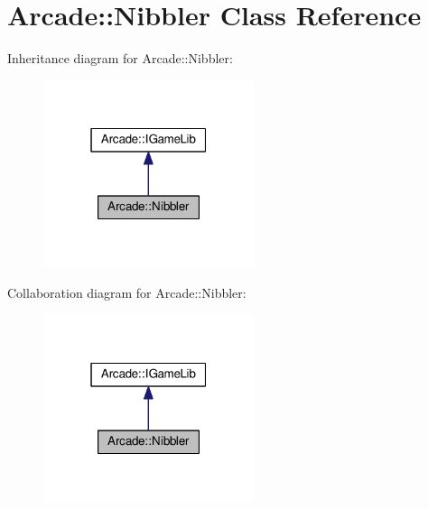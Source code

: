 \hypertarget{class_arcade_1_1_nibbler}{}\section{Arcade\+:\+:Nibbler Class Reference}
\label{class_arcade_1_1_nibbler}


Inheritance diagram for Arcade\+:\+:Nibbler\+:
\nopagebreak
\begin{figure}[H]
\begin{center}
\leavevmode
\includegraphics[width=175pt]{class_arcade_1_1_nibbler__inherit__graph}
\end{center}
\end{figure}


Collaboration diagram for Arcade\+:\+:Nibbler\+:
\nopagebreak
\begin{figure}[H]
\begin{center}
\leavevmode
\includegraphics[width=175pt]{class_arcade_1_1_nibbler__coll__graph}
\end{center}
\end{figure}
